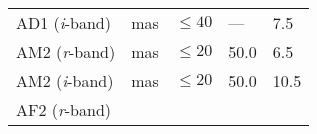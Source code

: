 \begin{longtable}[]{@{}lllll@{}}
\begin{minipage}[t]{0.19\columnwidth}
AD1 (\emph{i}-band)\strut
\end{minipage} & \begin{minipage}[t]{0.08\columnwidth}\raggedright\strut
mas\strut
\end{minipage} & \begin{minipage}[t]{0.20\columnwidth}\raggedright\strut
\(\leq 40\)\strut
\end{minipage} & \begin{minipage}[t]{0.22\columnwidth}\raggedright\strut
---\strut
\end{minipage} & \begin{minipage}[t]{0.17\columnwidth}\raggedright\strut
7.5\strut
\end{minipage}\tabularnewline
\begin{minipage}[t]{0.19\columnwidth}\raggedright\strut
AM2 (\emph{r}-band)\strut
\end{minipage} & \begin{minipage}[t]{0.08\columnwidth}\raggedright\strut
mas\strut
\end{minipage} & \begin{minipage}[t]{0.20\columnwidth}\raggedright\strut
\(\leq 20\)\strut
\end{minipage} & \begin{minipage}[t]{0.22\columnwidth}\raggedright\strut
50.0\strut
\end{minipage} & \begin{minipage}[t]{0.17\columnwidth}\raggedright\strut
6.5\strut
\end{minipage}\tabularnewline
\begin{minipage}[t]{0.19\columnwidth}\raggedright\strut
AM2 (\emph{i}-band)\strut
\end{minipage} & \begin{minipage}[t]{0.08\columnwidth}\raggedright\strut
mas\strut
\end{minipage} & \begin{minipage}[t]{0.20\columnwidth}\raggedright\strut
\(\leq 20\)\strut
\end{minipage} & \begin{minipage}[t]{0.22\columnwidth}\raggedright\strut
50.0\strut
\end{minipage} & \begin{minipage}[t]{0.17\columnwidth}\raggedright\strut
10.5\strut
\end{minipage}\tabularnewline
\begin{minipage}[t]{0.19\columnwidth}\raggedright\strut
AF2 (\emph{r}-band)\strut
\end{minipage} & \begin{minipage}[t]{0.08\columnwidth}\raggedright\strut

\end{minipage}
\end{longtable}
